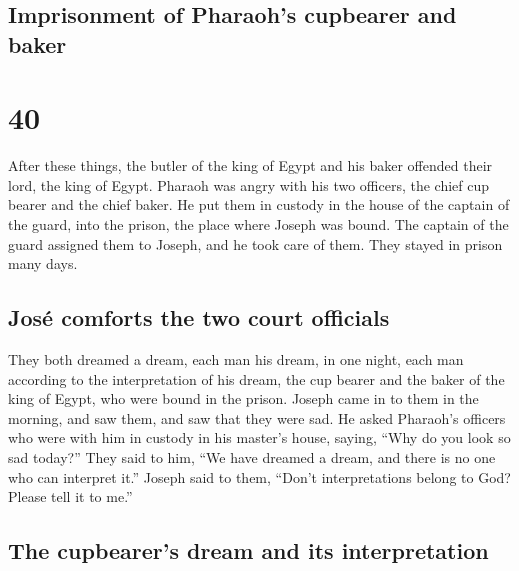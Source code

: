 \hypertarget{imprisonment-of-pharaohs-cupbearer-and-baker}{%
\subsection{Imprisonment of Pharaoh's cupbearer and
baker}\label{imprisonment-of-pharaohs-cupbearer-and-baker}}

\hypertarget{section-39}{%
\section{40}\label{section-39}}

 After these things, the butler of the king of Egypt and
his baker offended their lord, the king of Egypt.  Pharaoh
was angry with his two officers, the chief cup bearer and the chief
baker.  He put them in custody in the house of the captain
of the guard, into the prison, the place where Joseph was bound.
 The captain of the guard assigned them to Joseph, and he
took care of them. They stayed in prison many days.

\hypertarget{josuxe9-comforts-the-two-court-officials}{%
\subsection{José comforts the two court
officials}\label{josuxe9-comforts-the-two-court-officials}}

 They both dreamed a dream, each man his dream, in one
night, each man according to the interpretation of his dream, the cup
bearer and the baker of the king of Egypt, who were bound in the prison.
 Joseph came in to them in the morning, and saw them, and
saw that they were sad.  He asked Pharaoh's officers who
were with him in custody in his master's house, saying, ``Why do you
look so sad today?''  They said to him, ``We have dreamed
a dream, and there is no one who can interpret it.'' Joseph said to
them, ``Don't interpretations belong to God? Please tell it to me.''

\hypertarget{the-cupbearers-dream-and-its-interpretation}{%
\subsection{The cupbearer's dream and its
interpretation}\label{the-cupbearers-dream-and-its-interpretation}}

